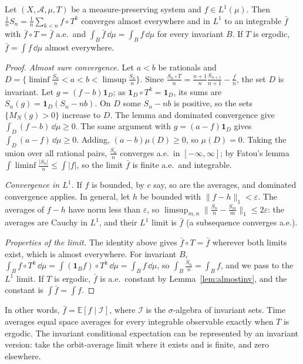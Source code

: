 \begin{theorem}\label{thm:birkhoff}
Let $(X,\mathcal A,\mu,T)$ be a measure-preserving system and $f\in L^1(\mu)$. Then $\frac1nS_n=\frac1n\sum_{k<n}f\circ T^k$ converges almost everywhere and in $L^1$ to an integrable $\bar f$ with $\bar f\circ T=\bar f$ a.e.\ and
$\int_B\bar f\,\dd\mu=\int_Bf\,\dd\mu$ for every invariant $B$. If $T$ is ergodic, $\bar f=\int f\,\dd\mu$ almost everywhere.
\end{theorem}
\begin{proof}
\emph{Almost sure convergence.} Let $a<b$ be rationals and $D=\{\liminf\frac{S_n}n<a<b<\limsup\frac{S_n}n\}$. Since $\frac{S_n\circ T}n=\frac{n+1}n\frac{S_{n+1}}{n+1}-\frac fn$, the set $D$ is invariant. Let
$g=(f-b)\mathbf 1_D$; as $\mathbf 1_D\circ T^k=\mathbf 1_D$, its sums are $S_n(g)=\mathbf 1_D(S_n-nb)$. On $D$ some $S_n-nb$ is positive, so the sets $\{M_N(g)>0\}$ increase to $D$. The lemma and dominated convergence
give $\int_D(f-b)\,\dd\mu\ge0$. The same argument with $g=(a-f)\mathbf 1_D$ gives $\int_D(a-f)\,\dd\mu\ge0$. Adding, $(a-b)\mu(D)\ge0$, so $\mu(D)=0$. Taking the union over all rational pairs, $\frac{S_n}n$ converges a.e.\ in $[-\infty,\infty]$; by
Fatou's lemma $\int\liminf\frac{|S_n|}n\le\int|f|$, so the limit $\bar f$ is finite a.e.\ and integrable.

\emph{Convergence in $L^1$.} If $f$ is bounded, by $c$ say, so are the averages, and dominated convergence applies. In general, let $h$ be bounded with $\|f-h\|_1<\varepsilon$. The averages of $f-h$ have norm less than
$\varepsilon$, so $\limsup_{m,n}\|\frac{S_n}n-\frac{S_m}m\|_1\le2\varepsilon$: the averages are Cauchy in $L^1$, and their $L^1$ limit is $\bar f$ (a subsequence converges a.e.).

\emph{Properties of the limit.} The identity above gives $\bar f\circ T=\bar f$ wherever both limits exist, which is almost everywhere. For invariant $B$, $\int_Bf\circ T^k\,\dd\mu=\int(\mathbf 1_Bf)\circ T^k\,\dd\mu=\int_Bf\,\dd\mu$, so
$\int_B\frac{S_n}n=\int_Bf$, and we pass to the $L^1$ limit. If $T$ is ergodic, $\bar f$ is a.e.\ constant by Lemma~\ref{lem:almostinv}, and the constant is $\int\bar f=\int f$.
\end{proof}

In other words, $\bar f=\mathbb E[f\mid\mathcal I]$, where $\mathcal I$ is the $\sigma$-algebra of invariant sets. Time averages equal space averages for every integrable observable exactly when $T$ is ergodic. The invariant conditional expectation can be represented by an invariant version: take the orbit-average limit where it exists and is finite, and zero elsewhere.

